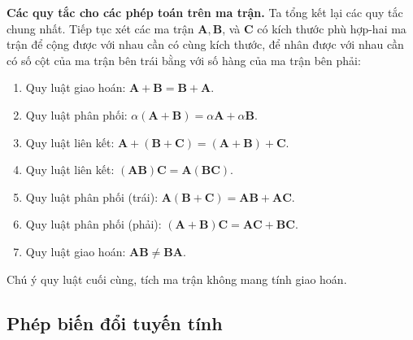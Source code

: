 \textbf{Các quy tắc cho các phép toán trên ma trận.} Ta tổng kết lại các quy tắc chung nhất.
Tiếp tục xét các ma trận \(\mathbf{A},\mathbf{B}\), và \(\mathbf{C}\) có kích thước phù hợp-hai ma trận để cộng được với nhau cần có cùng kích thước, để nhân được với nhau cần có số cột của ma trận bên trái bằng với số hàng của ma trận bên phải:
\begin{enumerate}[label=(\alph*)]
    \item Quy luật giao hoán: \(\mathbf{A}+\mathbf{B}=\mathbf{B}+\mathbf{A}.\)
    \item Quy luật phân phối: \(\alpha(\mathbf{A}+\mathbf{B})=\alpha\mathbf{A}+\alpha\mathbf{B}.\)
    \item Quy luật liên kết: \(\mathbf{A}+(\mathbf{B}+\mathbf{C})=(\mathbf{A}+\mathbf{B})+\mathbf{C}.\)
    \item Quy luật liên kết: \((\mathbf{AB})\mathbf{C}=\mathbf{A}(\mathbf{BC}).\)
    \item Quy luật phân phối (trái): \(\mathbf{A}(\mathbf{B}+\mathbf{C})=\mathbf{AB}+\mathbf{AC}.\)
    \item Quy luật phân phối (phải): \((\mathbf{A}+\mathbf{B})\mathbf{C}=\mathbf{AC}+\mathbf{BC}.\)
    \item Quy luật giao hoán: \(\mathbf{AB} \neq \mathbf{BA}\).
\end{enumerate}
Chú ý quy luật cuối cùng, tích ma trận không mang tính giao hoán.

\subsection{Phép biến đổi tuyến tính}
